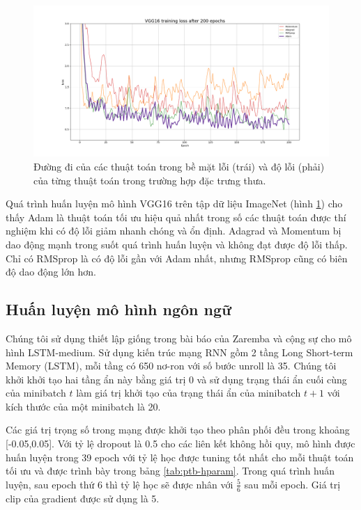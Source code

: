 \begin{figure}[htp]
	\centering
	\includegraphics[width=140 mm]{images/vgg16.png}
	\caption{Đường đi của các thuật toán trong bề mặt lỗi (trái) và độ lỗi (phải) của từng thuật toán trong trường hợp đặc trưng thưa.}
	\label{fig:vgg16-loss}
\end{figure}

Quá trình huấn luyện mô hình VGG16 trên tập dữ liệu ImageNet (hình \ref{fig:vgg16-loss}) cho thấy Adam là thuật toán tối ưu hiệu quả nhất trong số các thuật toán được thí nghiệm khi có độ lỗi giảm nhanh chóng và ổn định. Adagrad và Momentum bị dao động mạnh trong suốt quá trình huấn luyện và không đạt được độ lỗi thấp. Chỉ có RMSprop là có độ lỗi gần với Adam nhất, nhưng RMSprop cũng có biên độ dao động lớn hơn.

\subsection{Huấn luyện mô hình ngôn ngữ}

Chúng tôi sử dụng thiết lập giống trong bài báo của Zaremba và cộng sự \cite{zaremba2014recurrent} cho mô hình LSTM-medium. Sử dụng kiến trúc mạng RNN gồm 2 tầng Long Short-term Memory (LSTM), mỗi tầng có 650 nơ-ron với số bước unroll là 35. Chúng tôi khởi khởi tạo hai tầng ẩn này bằng giá trị 0 và sử dụng trạng thái ẩn cuối cùng của minibatch $t$ làm giá trị khởi tạo của trạng thái ẩn của minibatch $t+1$ với kích thước của một minibatch là 20.

Các giá trị trọng số trong mạng được khởi tạo theo phân phối đều trong khoảng [-0.05,0.05]. Với tỷ lệ dropout là 0.5 cho các liên kết không hồi quy, mô hình được huấn luyện trong 39 epoch với tỷ lệ học được tuning tốt nhất cho mỗi thuật toán tối ưu và được trình bày trong bảng \ref{tab:ptb-hparam}. Trong quá trình huấn luyện, sau epoch thứ 6 thì tỷ lệ học sẽ được nhân với $\frac{5}{6}$ sau mỗi epoch. Giá trị clip của gradient được sử dụng là 5.

